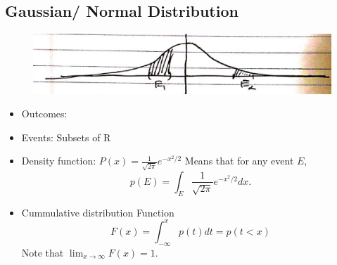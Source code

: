 \subsection{Gaussian/ Normal Distribution}
 \begin{figure}[ht!]
	\centering
	\includegraphics[width=.7\textwidth]{../figures/probability3.png}  
\end{figure}
\begin{itemize}
	\item Outcomes: 
	\item Events: Subsets of R
	\item Density function: $P(x)=\frac{1}{\sqrt{2\pi}} e^{-x^{2} / 2}$\newline
	         Means that for any event $E$,
	         $$
	         p\left(E\right)=\int_{E} \frac{1}{\sqrt{2 \pi}} e^{-x^{2} / 2} d x.
	         $$
	         
	 \item Cummulative distribution Function 
	 $$
	 F(x)=\int_{-\infty}^{x} p(t) d t=p(t<x)
	 $$
	 Note that $\lim_{x\rightarrow \infty} F(x)=1$.
\end{itemize}

